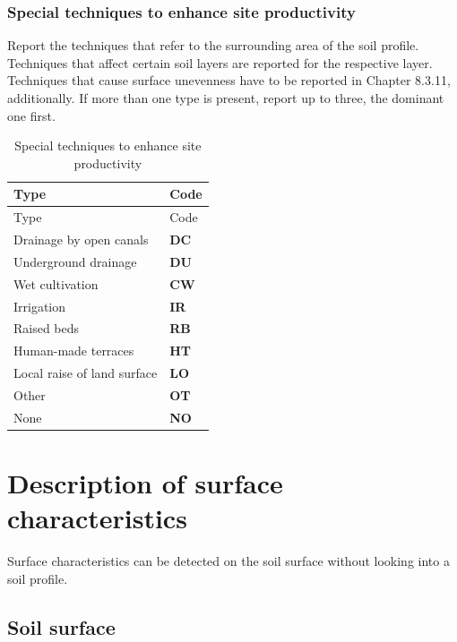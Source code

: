 \documentclass[
  letterpaper,
  DIV=11,
  numbers=noendperiod]{scrreprt}
\begin{document}
\hypertarget{special-techniques-to-enhance-site-productivity}{%
\subsubsection{Special techniques to enhance site
productivity}\label{special-techniques-to-enhance-site-productivity}}

Report the techniques that refer to the surrounding area of the soil
profile. Techniques that affect certain soil layers are reported for the
respective layer. Techniques that cause surface unevenness have to be
reported in Chapter 8.3.11, additionally. If more than one type is
present, report up to three, the dominant one first.

\begin{longtable}[]{@{}ll@{}}
\caption{Special techniques to enhance site productivity}\tabularnewline
\toprule()
Type & Code \\
\midrule()
\endfirsthead
\toprule()
Type & Code \\
\midrule()
\endhead
Drainage by open canals & \textbf{DC} \\
Underground drainage & \textbf{DU} \\
Wet cultivation & \textbf{CW} \\
Irrigation & \textbf{IR} \\
Raised beds & \textbf{RB} \\
Human-made terraces & \textbf{HT} \\
Local raise of land surface & \textbf{LO} \\
Other & \textbf{OT} \\
None & \textbf{NO} \\
\bottomrule()
\end{longtable}

\hypertarget{description-of-surface-characteristics}{%
\section{Description of surface
characteristics}\label{description-of-surface-characteristics}}

Surface characteristics can be detected on the soil surface without
looking into a soil profile.

\hypertarget{soil-surface}{%
\subsection{Soil surface}\label{soil-surface}}
\end{document}
